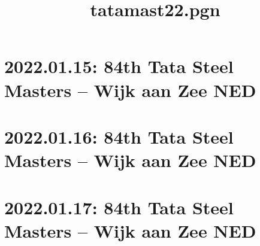 \documentclass[11pt]{article}
\title{tatamast22.pgn}
\begin{document}
\maketitle


\tableofcontents
\pagebreak[4]

\printindex
\pagebreak[4]

\section{2022.01.15: 84th Tata Steel Masters -- Wijk aan Zee NED}

\pagebreak[4]


\pagebreak[4]


\pagebreak[4]


\pagebreak[4]


\pagebreak[4]


\pagebreak[4]


\pagebreak[4]

\section{2022.01.16: 84th Tata Steel Masters -- Wijk aan Zee NED}

\pagebreak[4]


\pagebreak[4]


\pagebreak[4]


\pagebreak[4]


\pagebreak[4]


\pagebreak[4]


\pagebreak[4]

\section{2022.01.17: 84th Tata Steel Masters -- Wijk aan Zee NED}

\pagebreak[4]
\end{document}

